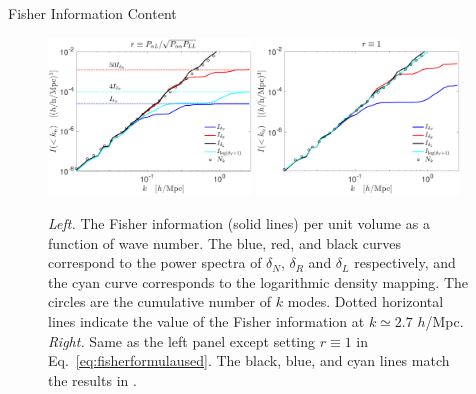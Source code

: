 \begin{section}{Fisher Information Content}
  \begin{figure}
    \includegraphics[width=0.48\textwidth]{fig4a.pdf}
    \includegraphics[width=0.48\textwidth]{fig4b.pdf}
    \centering
    \caption{{\it Left.} The Fisher information (solid lines) per unit volume as
      a function of wave number.  The blue, red, and black curves correspond to the power spectra
      of $\delta_N$, $\delta_R$ and $\delta_L$ respectively,
      and the cyan curve
      corresponds to the logarithmic density mapping. The circles
      are the cumulative number of $k$ modes.  Dotted horizontal lines indicate the value of the 
      Fisher information at $k \simeq 2.7$ $h$/Mpc.  {\it Right.} Same
      as the left panel except setting $r\equiv 1$ in Eq.~\ref{eq:fisherformulaused}. The
      black, blue, and cyan lines match the results in \cite{bib:Rimes2006,bib:Mark2009}.}
  \label{fig:fisherinfo}
\end{figure}
\end{section}
